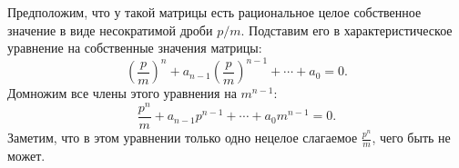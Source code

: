 \documentclass{article}
\begin{document}
Предположим, что у такой матрицы есть рациональное целое собственное значение в виде несократимой дроби $p/m$. Подставим его в характеристическое уравнение на собственные значения матрицы:
$$\left( \frac{p}{m} \right)^n + a_{n-1} \left( \frac{p}{m} \right)^{n-1} + \cdots + a_0 = 0.$$
Домножим все члены этого уравнения на $m^{n-1}$:
$$\frac{p^n}{m} + a_{n-1} p^{n-1} + \cdots + a_0 m^{n-1} = 0.$$
Заметим, что в этом уравнении только одно нецелое слагаемое $\frac{p^n}{m}$, чего быть не может.
\end{document}
